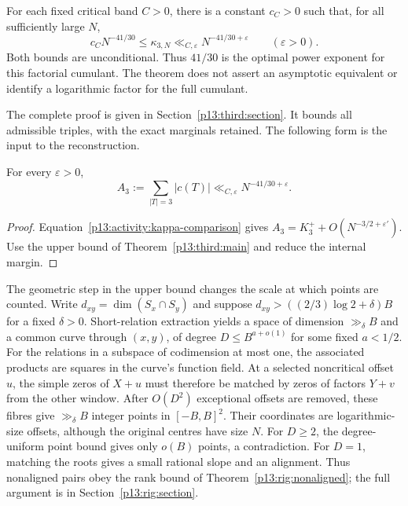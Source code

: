 \begin{theorem}
\label{p13:third:main}
For each fixed critical band $C>0$, there is a constant $c_C>0$ such
that, for all sufficiently large $N$,
\begin{equation}
 c_C N^{-41/30}\leq\kappa_{3,N}
              \ll_{C,\varepsilon}N^{-41/30+\varepsilon}
              \qquad(\varepsilon>0).
 \label{p13:third:two-sided}
\end{equation}
Both bounds are unconditional.  Thus $41/30$ is the optimal power
exponent for this factorial cumulant.  The theorem does not assert an
asymptotic equivalent or identify a logarithmic factor for the full
cumulant.
\end{theorem}

The complete proof is given in Section~\ref{p13:third:section}.
It bounds all admissible triples, with the exact marginals retained.
The following form is the input to the reconstruction.

\begin{corollary}
\label{p13:third:activity}
For every $\varepsilon>0$,
\begin{equation}
 A_3:=\sum_{|T|=3}|c(T)|
            \ll_{C,\varepsilon}N^{-41/30+\varepsilon}.
 \label{p13:third:absolute}
\end{equation}
\end{corollary}

\begin{proof}
Equation~\eqref{p13:activity:kappa-comparison} gives
$A_3=K_3^++O(N^{-3/2+\varepsilon'})$.
Use the upper bound of Theorem~\ref{p13:third:main} and reduce the internal margin.
\end{proof}


The geometric step in the upper bound changes the scale at which points
are counted. Write $d_{xy}=\dim(S_x\cap S_y)$ and suppose
$d_{xy}>((2/3)\log2+\delta)B$ for a fixed $\delta>0$.
Short-relation extraction yields a space of dimension $\gg_\delta B$
and a common curve through $(x,y)$, of degree
$D\le B^{a+o(1)}$ for some fixed $a<1/2$.
For the relations in a subspace of codimension at most one, the
associated products are squares in the curve's function field.
At a selected noncritical offset $u$, the simple zeros of $X+u$
must therefore be matched by zeros of factors $Y+v$ from the
other window. After $O(D^2)$ exceptional offsets
are removed, these fibres give $\gg_\delta B$ integer points in
$[-B,B]^2$. Their coordinates are logarithmic-size offsets, although
the original centres have size $N$. For $D\ge2$, the degree-uniform
point bound gives only $o(B)$ points, a contradiction. For $D=1$,
matching the roots gives a small rational slope and an alignment.
Thus nonaligned pairs obey the rank bound of
Theorem~\ref{p13:rig:nonaligned}; the full argument is in
Section~\ref{p13:rig:section}.

